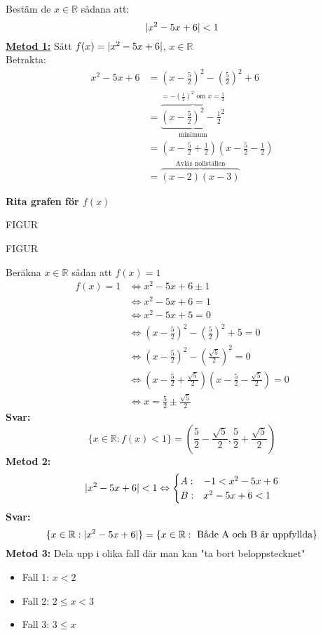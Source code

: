 \begin{Ex}
    Bestäm de $x \in \mathbb{R}$ sådana att:
    \[
    \lvert x^2 - 5x + 6\rvert < 1
    \]
    \textbf{\underline{Metod 1:}}
    Sätt $f(x) = \lvert x^2 - 5x + 6\rvert$, $x \in \mathbb{R}$ \\
    Betrakta:
    \begin{align*}
        x^2 - 5x + 6 &= (x - \frac{5}{2})^2 - (\frac{5}{2})^2 + 6 \\
        &= \underbrace{\overbrace{(x - \frac{5}{2})^2 - \frac{1}{2}^2}^{= - (\frac{1}{2})^2 \mbox{ om } x = \frac{5}{2}}}_{\mbox{minimum}} \\
        &= (x - \frac{5}{2} + \frac{1}{2})(x - \frac{5}{2} - \frac{1}{2}) \\
        &= \overbrace{(x - 2)(x - 3)}^{\mbox{Avläs nollställen}}
    \end{align*}

\textbf{Rita grafen för $f(x)$}

\begin{center}
    FIGUR
\end{center}
\begin{center}
    FIGUR
\end{center}
\end{Ex}

Beräkna $x \in \mathbb{R}$ sådan att $f(x) = 1$
\begin{align*}
    f(x) = 1 &\Leftrightarrow x^2 - 5x + 6 \pm 1\\
    &\Leftrightarrow x^2 - 5x + 6 = 1\\
    &\Leftrightarrow x^2 - 5x + 5 = 0\\
    &\Leftrightarrow (x - \frac{5}{2})^2 - (\frac{5}{2})^2 + 5 = 0 \\
    &\Leftrightarrow (x - \frac{5}{2})^2 - (\frac{\sqrt{5}}{2})^2 = 0 \\
    &\Leftrightarrow (x - \frac{5}{2} + \frac{\sqrt{5}}{2})(x - \frac{5}{2} - \frac{\sqrt{5}}{2}) = 0\\
    &\Leftrightarrow x = \frac{5}{2} \pm \frac{\sqrt{5}}{2}
\end{align*}
\textbf{Svar:}
\[
\{x \in \mathbb{R}: f(x) < 1\} = (\frac{5}{2} - \frac{\sqrt{5}}{2}, \frac{5}{2} + \frac{\sqrt{5}}{2})
\]
\textbf{Metod 2:}
\[
\lvert x^2 - 5x + 6\rvert < 1 \Leftrightarrow
\begin{cases}
    A: & -1 < x^2 - 5x + 6 \\
    B: & x^2 - 5x + 6 < 1
\end{cases}
\]
\textbf{Svar:}
\[
\{x \in \mathbb{R}: \lvert x^2 - 5x + 6\rvert\} = \{x \in \mathbb{R}: \mbox{ Både A och B är uppfyllda}\}
\]
\textbf{Metod 3:}
Dela upp i olika fall där man kan "ta bort beloppstecknet"
\begin{itemize}
    \item Fall 1: $x < 2$
    \item Fall 2: $2 \le x < 3$
    \item Fall 3: $3 \le x$
\end{itemize}


